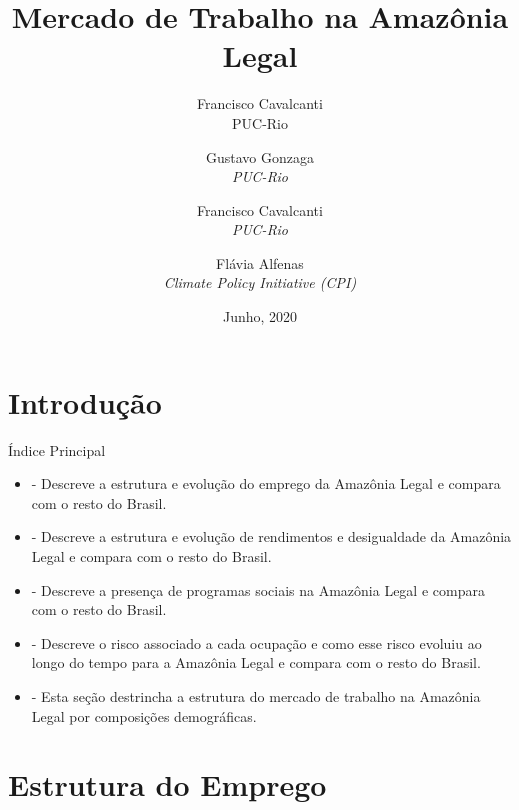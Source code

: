 \documentclass[11pt]{beamer}
\author[Francisco Cavalcanti]{Francisco Cavalcanti\\\footnotesize{PUC-Rio}
}
\author{
Gustavo Gonzaga \\
\textit{PUC-Rio}\\ \vspace{3mm}
\and  
Francisco Cavalcanti\\
\textit{PUC-Rio}\\ \vspace{3mm}
\and   
Flávia  Alfenas\\
\textit{Climate Policy Initiative (CPI)} 
}
\date{Junho, 2020}
\title{Mercado de Trabalho na Amazônia Legal}
\begin{document}
\begin{frame}
\titlepage
\end{frame}


\section{Introdução}

\begin{frame}[label=indice_principal]{Índice Principal}

\begin{itemize}
\item{
	\hyperlink{_estrutura_emprego}{} - Descreve a estrutura e evolução do emprego da Amazônia Legal e compara com o resto do Brasil.
	}   
		
\item{
	\hyperlink{_estrutura_renda}{} - Descreve a estrutura e evolução de rendimentos e desigualdade da Amazônia Legal e compara com o resto do Brasil.
	}  
	
\item{
	\hyperlink{_programas_sociais}{} - Descreve a presença de programas sociais na Amazônia Legal e compara com o resto do Brasil.
	}  
	
\item{
	\hyperlink{_transicao_ocupacao}{} - Descreve o risco associado a cada ocupação e como esse risco evoluiu ao longo do tempo para a Amazônia Legal e compara com o resto do Brasil.
	}  
	
\item{
	\hyperlink{_composicao_demografica}{} - Esta seção destrincha a estrutura do mercado de trabalho na Amazônia Legal por composições demográficas.
	}  

\end{itemize}

\end{frame}

\section{Estrutura do Emprego}


\end{document}
